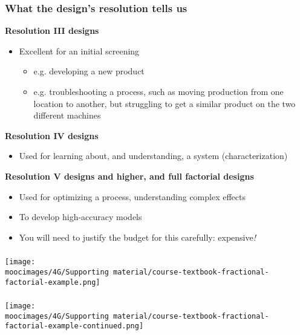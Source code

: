 \documentclass[handout,11pt,aspectratio=169,mathserif]{beamer}
\begin{document}
\begin{frame}\frametitle{What the design's resolution tells us}

	\textbf{Resolution \textrm{III} designs}
	\begin{itemize}
		\item	Excellent for an initial screening
			\begin{itemize}
				\item	e.g. developing a new product 
				\item	e.g. troubleshooting a process, such as moving production from one location to another, but struggling to get a similar product on the two different machines
			\end{itemize}
	\end{itemize}

	\pause
	\vspace{0.5cm}
	\textbf{Resolution \textrm{IV} designs}
	\begin{itemize}
		\item	Used for learning about, and understanding, a system (characterization)
	\end{itemize}
	
	\pause
	\vspace{0.5cm}
	\textbf{Resolution \textrm{V} designs and higher, and full factorial designs}
	\begin{itemize}
		\item	Used for optimizing a process, understanding complex effects
		\item	To develop high-accuracy models
		\item	You will need to justify the budget for this carefully: expensive\emph{!}
	\end{itemize}
\end{frame}

\begin{frame}\frametitle{}
	\vspace{0.5cm}
	\centerline{\texttt{[image: \\moocimages/4G/Supporting material/course-textbook-fractional-factorial-example.png]}}
		
\end{frame}

\begin{frame}\frametitle{}
	\vspace{0.5cm}
	\centerline{\texttt{[image: \\moocimages/4G/Supporting material/course-textbook-fractional-factorial-example-continued.png]}}
		
\end{frame}
\end{document}
